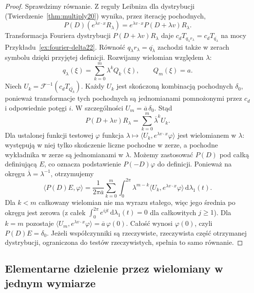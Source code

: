 \begin{proof}
Sprawdzimy równanie. Z reguły Leibniza dla dystrybucji
(Twierdzenie~\ref{thm:multiply20}) wynika, przez
iterację pochodnych,
\[
 P(D)(e^{\lambda v\cdot x}R_\lambda)
 =e^{\lambda v\cdot x}P(D+\lambda v)R_\lambda.
\]
Transformacja Fouriera dystrybucji $P(D+\lambda v)R_\lambda$ daje
$c_d T_{q_\lambda r_\lambda}
=c_d T_{\overline{q_\lambda}}$ na mocy
Przykładu~\ref{ex:fourier-delta22}. Równość
$q_\lambda r_\lambda=\overline{q_\lambda}$ zachodzi
także w zerach symbolu dzięki przyjętej definicji.
Rozwijamy wielomian względem $\lambda$:
\[
 q_\lambda(\xi)=\sum_{k=0}^m\lambda^k Q_k(\xi),
 \qquad Q_m(\xi)=a.
\]
Niech $U_k=\mathcal F^{-1}(c_d T_{\overline{Q_k}})$.
Każdy $U_k$ jest skończoną kombinacją pochodnych
$\delta_0$, ponieważ transformacje tych pochodnych
są jednomianami pomnożonymi przez $c_d$ i odpowiednie
potęgi $i$. W szczególności $U_m=\overline a\,\delta_0$.
Stąd
\[
 P(D+\lambda v)R_\lambda=\sum_{k=0}^m\overline\lambda^k U_k.
\]
Dla ustalonej funkcji testowej $\varphi$ funkcja
$\lambda\mapsto\langle U_k,e^{\lambda v\cdot x}\varphi\rangle$
jest wielomianem w $\lambda$: występują w niej tylko
skończenie liczne pochodne w zerze, a pochodne
wykładnika w zerze są jednomianami w $\lambda$.
Możemy zastosować $P(D)$ pod całką definiującą $E$,
co oznacza podstawienie $P(-D)\varphi$ do definicji.
Ponieważ na okręgu $\overline\lambda=\lambda^{-1}$,
otrzymujemy
\[
 \langle P(D)E,\varphi\rangle
 =\frac1{2\pi\overline a}
 \sum_{k=0}^m\int_0^{2\pi}
 \lambda^{m-k}\langle U_k,e^{\lambda v\cdot x}\varphi\rangle
 \,\mathrm d\lambda_1(t).
\]
Dla $k<m$ całkowany wielomian nie ma wyrazu stałego,
więc jego średnia po okręgu jest zerowa
(z całek $\int_0^{2\pi}e^{ijt}\,\mathrm d\lambda_1(t)=0$
dla całkowitych $j\ge1$). Dla $k=m$ pozostaje
$\langle U_m,e^{\lambda v\cdot x}\varphi\rangle
=\overline a\,\varphi(0)$. Całość wynosi $\varphi(0)$,
czyli $P(D)E=\delta_0$.
Jeżeli współczynniki są rzeczywiste, rzeczywista
część otrzymanej dystrybucji, ograniczona do testów
rzeczywistych, spełnia to samo równanie.
\end{proof}

\subsection{Elementarne dzielenie przez wielomiany w jednym wymiarze}

